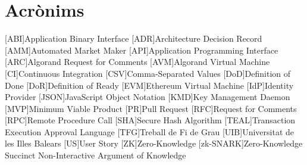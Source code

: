\chapter{Acrònims} %
%
%
\begin{acronym}

[ABI]{Application Binary Interface}
[ADR]{Architecture Decision Record}
[AMM]{Automated Market Maker}
[API]{Application Programming Interface}
[ARC]{Algorand Request for Comments}
[AVM]{Algorand Virtual Machine}
[CI]{Continuous Integration}
[CSV]{Comma-Separated Values}
[DoD]{Definition of Done}
[DoR]{Definition of Ready}
[EVM]{Ethereum Virtual Machine}
[IdP]{Identity Provider}
[JSON]{JavaScript Object Notation}
[KMD]{Key Management Daemon}
[MVP]{Minimum Viable Product}
[PR]{Pull Request}
[RFC]{Request for Comments}
[RPC]{Remote Procedure Call}
[SHA]{Secure Hash Algorithm}
[TEAL]{Transaction Execution Approval Language}
[TFG]{Treball de Fi de Grau}
[UIB]{Universitat de les Illes Balears}
[US]{User Story}
[ZK]{Zero-Knowledge}
[zk-SNARK]{Zero-Knowledge Succinct Non-Interactive Argument of Knowledge}

\end{acronym}
